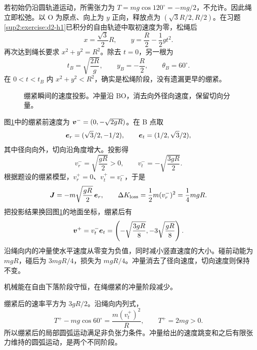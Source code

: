 \begin{solution}
若初始仍沿圆轨道运动，所需张力为 $T=mg\cos120^\circ=-mg/2$，不允许。因此绳立即松弛。以 O 为原点、向上为 $y$ 正向，释放点为 $(\sqrt3R/2,R/2)$。在习题\ref{sup2:exercise:d2-h1}已积分的自由轨迹中取初速度为零，松绳后
\[
x=\frac{\sqrt3}2R,\qquad y=\frac R2-\frac12gt^2.
\]
再次达到绳长要求 $x^2+y^2=R^2$。除去 $t=0$，另一根为
\[
t_B=\sqrt{\frac{2R}g},\qquad y_B=-\frac R2,
\qquad\theta_B=60^\circ.
\]
在 $0<t<t_B$ 内 $x^2+y^2<R^2$，确实是松绳阶段，没有遗漏更早的绷紧。

\begin{figure}[H]\centering
{}
\caption{绷紧瞬间的速度投影。冲量沿 BO，消去向外径向速度，保留切向分量。}\label{deep2:fig:d2-h2-s}
\end{figure}

图\ref{deep2:fig:d2-h2-s}中的绷紧前速度为 $\bm{v}^-=(0,-\sqrt{2gR})$。在 B 点取
\[
\bm{e}_r=(\sqrt3/2,-1/2),\qquad
\bm{e}_t=(1/2,\sqrt3/2),
\]
其中径向向外，切向沿角度增大。投影得
\[
v_r^- =\sqrt{\frac{gR}{2}}>0,\qquad
v_t^-=-\sqrt{\frac{3gR}{2}}.
\]
根据题设的绷紧模型，$v_r^+=0$、$v_t^+=v_t^-$，于是
\[
\bm{J}=-m\sqrt{\frac{gR}{2}}\,\bm{e}_r,\qquad
\Delta K_{\rm loss}=\frac12m(v_r^-)^2=\frac14mgR.
\]
把投影结果换回图\ref{deep2:fig:d2-h2-s}的地面坐标，绷紧后有
\[
\bm{v}^+=v_t^-\bm{e}_t
=\left(-\sqrt{\frac{3gR}{8}},-3\sqrt{\frac{gR}{8}}\right).
\]
沿绳向内的冲量使水平速度从零变为负值，同时减小竖直速度的大小。碰前动能为 $mgR$，碰后为 $3mgR/4$，损失为 $mgR/4$。冲量消去了径向速度，切向速度则保持不变。

机械能在自由下落阶段守恒，在绳绷紧的冲量阶段减少。

绷紧后的速率平方为 $3gR/2$。沿绳向内列式，
\[
T^+-mg\cos60^\circ=\frac{m(v_t^+)^2}{R},
\qquad T^+=2mg>0.
\]
所以绷紧后的局部圆弧运动满足非负张力条件。冲量给出的速度跳变和之后有限张力维持的圆弧运动，是两个不同阶段。

\end{solution}


